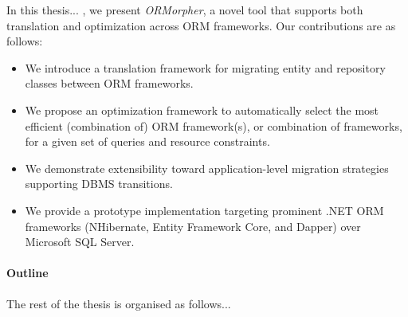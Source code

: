 In this thesis... , we present \emph{ORMorpher}, a novel tool that supports both translation and optimization across ORM frameworks. Our contributions are as follows:
\begin{itemize}
    \item We introduce a translation framework for migrating entity and repository classes between ORM frameworks.
    \item We propose an optimization framework to automatically select the most efficient (combination of) ORM framework(s), or combination of frameworks, for a given set of queries and resource constraints.
    \item We demonstrate extensibility toward application-level migration strategies supporting DBMS transitions.
    \item We provide a prototype implementation targeting prominent .NET ORM frameworks (NHibernate, Entity Framework Core, and Dapper) over Microsoft SQL Server.
\end{itemize}

\paragraph{Outline} The rest of the thesis is organised as follows...